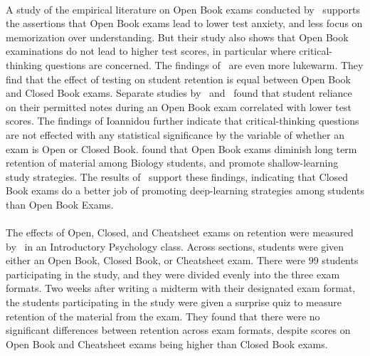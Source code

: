 \documentclass[12pt]{article}
\begin{document}
\paragraph{}
A study of the empirical literature on Open Book exams conducted by~\cite{theophilides2000study} supports the assertions that Open Book exams lead to lower test anxiety, and less focus on memorization over understanding. But their study also shows that Open Book examinations do not lead to higher test scores, in particular where critical-thinking questions are concerned. The findings of~\cite{agarwal2008examining} are even more lukewarm. They find that the effect of testing on student retention is equal between Open Book and Closed Book exams. Separate studies by~\cite{ioannidou1997testing} and~\cite{boniface1985candidates} found that student reliance on their permitted notes during an Open Book exam correlated with lower test scores. The findings of Ioannidou further indicate that critical-thinking questions are not effected with any statistical significance by the variable of whether an exam is Open or Closed Book. \cite{moore2007open} found that Open Book exams diminish long term retention of material among Biology students, and promote shallow-learning study strategies. The results of~\cite{heijne2011directing} support these findings, indicating that Closed Book exams do a better job of promoting deep-learning strategies among students than Open Book Exams.
\paragraph{}
The effects of Open, Closed, and Cheatsheet exams on retention were measured by~\cite{gharib2012cheat} in an Introductory Psychology class. Across sections, students were given either an Open Book, Closed Book, or Cheatsheet exam. There were $99$ students participating in the study, and they were divided evenly into the three exam formats. Two weeks after writing a midterm with their designated exam format, the students participating in the study were given a surprise quiz to measure retention of the material from the exam. They found that there were no significant differences between retention across exam formats, despite scores on Open Book and Cheatsheet exams being higher than Closed Book exams.
\end{document}
